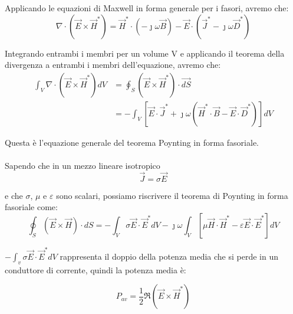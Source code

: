 Applicando le equazioni di Maxwell in forma generale per i fasori, avremo che: 
{
    \Large
    \begin{equation}
    \nabla \cdot (\vec{E} \times \vec{H}^{*}) = \vec{H}^{*} \cdot (- \jmath \omega \vec{B}) - \vec{E} \cdot (\vec{J}^{*} - \jmath \omega \vec{D}^{*})      
    \end{equation}
}

Integrando entrambi i membri per un volume V e applicando il teorema della divergenza a entrambi i membri dell'equazione, avremo che: \\ 

{\Large \begin{equation}
    \begin{split}
        \int_V \nabla \cdot (\vec{E} \times \vec{H}^{*}) dV 
        &= \oint_S (\vec{E} \times \vec{H}^{*}) \cdot \vec{dS} 
        \\
        &= - \int_V [\vec{E} \cdot \vec{J}^{*} + \jmath \omega (\vec{H}^{*} \cdot \vec{B} - \vec{E} \cdot \vec{D}^{*})] dV       
    \end{split}
\end{equation}}

Questa è l'equazione generale del teorema Poynting in forma fasoriale. \\ \\ 

Sapendo che in un mezzo lineare isotropico 
{
    \Large
    \begin{equation}
    \vec{J} = \sigma \vec{E}         
    \end{equation}
}

e che $\sigma$, $\mu$ e $\varepsilon$ sono scalari, 
possiamo riscrivere il teorema di Poynting in forma fasoriale come: \\ 

{\Large \begin{equation}
    \oint_S (\vec{E} \times \vec{H}) \cdot dS = - \int_V \sigma \vec{E} \cdot \vec{E}^{*} dV - \jmath \omega \int_V [\mu \vec{H} \cdot \vec{H}^{*} - \varepsilon \vec{E} \cdot \vec{E}^{*}] dV
\end{equation}}

$- \int_v \sigma \vec{E} \cdot \vec{E}^{*} dV $ rappresenta il doppio della potenza media che si perde in un conduttore 
di corrente, quindi la potenza media è: 

{\Large \begin{equation}
    P_{av} = \frac{1}{2} \Re(\vec{E} \times \vec{H}^{*})
\end{equation}}


